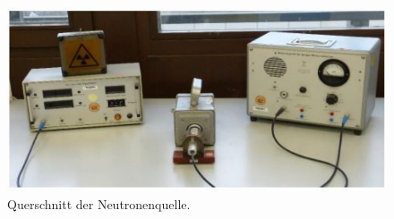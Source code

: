 \begin{figure}
    \includegraphics[width =\textwidth]{content/QuerschnittQuelle.pdf}
    \caption{Querschnitt der Neutronenquelle.\cite{anleitung}}
    \label{fig:QuelleQuerschnitt}
\end{figure}

